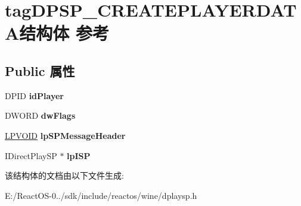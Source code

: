 \hypertarget{structtag_d_p_s_p___c_r_e_a_t_e_p_l_a_y_e_r_d_a_t_a}{}\section{tag\+D\+P\+S\+P\+\_\+\+C\+R\+E\+A\+T\+E\+P\+L\+A\+Y\+E\+R\+D\+A\+T\+A结构体 参考}
\label{structtag_d_p_s_p___c_r_e_a_t_e_p_l_a_y_e_r_d_a_t_a}
\subsection*{Public 属性}
\begin{DoxyCompactItemize}
\item 
\mbox{\label{structtag_d_p_s_p___c_r_e_a_t_e_p_l_a_y_e_r_d_a_t_a_a94f302a4973f8e3093f3c1632421900e}} 
D\+P\+ID {\bfseries id\+Player}
\item 
\mbox{\label{structtag_d_p_s_p___c_r_e_a_t_e_p_l_a_y_e_r_d_a_t_a_aa2992b1d44796f518620993ec48df7fa}} 
D\+W\+O\+RD {\bfseries dw\+Flags}
\item 
\mbox{\label{structtag_d_p_s_p___c_r_e_a_t_e_p_l_a_y_e_r_d_a_t_a_a68efc4b5cc8fd16285ad1c5c697965c2}} 
\hyperlink{interfacevoid}{L\+P\+V\+O\+ID} {\bfseries lp\+S\+P\+Message\+Header}
\item 
\mbox{\label{structtag_d_p_s_p___c_r_e_a_t_e_p_l_a_y_e_r_d_a_t_a_a1149792acbc112daaf8c73fbe4d18ec2}} 
I\+Direct\+Play\+SP $\ast$ {\bfseries lp\+I\+SP}
\end{DoxyCompactItemize}


该结构体的文档由以下文件生成\+:\begin{DoxyCompactItemize}
\item 
E\+:/\+React\+O\+S-\/0../sdk/include/reactos/wine/dplaysp.\+h\end{DoxyCompactItemize}
